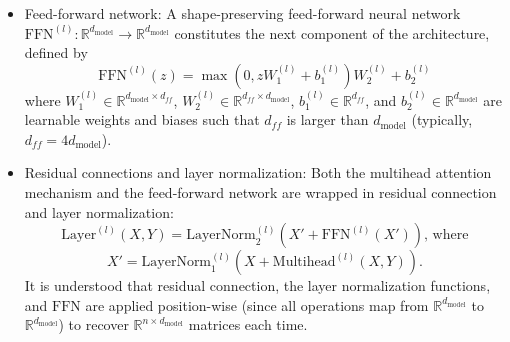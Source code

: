 \documentclass[stu,floatsintext]{apa7}
\begin{document}
\begin{itemize}
where $X\in\mathbb R^{n\times d_{\text{model}}}$ and $Y\in\mathbb R^{m\times d_{\text{model}}}$ are two input sequences of $d_{\text{model}}$-dimensional vectors, and matrices $W_i^{Q(l)}\in\mathbb R^{d_{\text{model}}\times d_k}$, $W_i^{K(l)}\in\mathbb R^{d_{\text{model}}\times d_k}$, and $W_i^{V(l)}\in\mathbb R^{d_{\text{model}}\times d_v}$ are learnable linear transformations that bring the input sequence vectors into each head's unique subspace of vector representations. Typically, $d_k=d_v=d_{\text{model}}/h$ is chosen in order to match the computational cost of a single head of attention with $d_{\text{model}}$-dimensional input vectors, but this is not restrictive. In order to summarize the outputs from all attention heads, all outputs are concatenated and projected back into the model's $d_{\text{model}}$-dimensional subspace using another learnable weight matrix $W^{O(l)}\in\mathbb R^{hd_v\times d_{\text{model}}}$. All in all, the function $\text{Multihead}^{(l)}:\mathbb R^{n\times d_{\text{model}}}\times\mathbb R^{m\times d_{\text{model}}}\to\mathbb R^{n\times d_{\text{model}}}$ wraps the entire multi-head attention process as follows:
\begin{equation}\text{Multihead}^{(l)}(X,Y) = \text{Concat}_{\text{2nd dim}}\left(\text{head}_1^{(l)}(X,Y), \dots, \text{head}_h^{(l)}(X,Y)\right)W^{O(l)}.\end{equation}
Notice that $\text{Multihead}^{(l)}$ preserves the shape of $X$.
\item Feed-forward network: A shape-preserving feed-forward neural network $\text{FFN}^{(l)}:\mathbb R^{d_{\text{model}}}\to\mathbb R^{d_{\text{model}}}$ constitutes the next component of the architecture, defined by
\begin{equation}\text{FFN}^{(l)}(z) = \max\left(0, zW_1^{(l)} + b_1^{(l)}\right)W_2^{(l)} + b_2^{(l)}\end{equation}
where $W_1^{(l)} \in \mathbb{R}^{d_{\text{model}} \times d_{ff}}$, $W_2^{(l)} \in \mathbb{R}^{d_{ff} \times d_{\text{model}}}$, $b_1^{(l)}\in\mathbb R^{d_{ff}}$, and $b_2^{(l)}\in\mathbb R^{d_{\text{model}}}$ are learnable weights and biases such that $d_{ff}$ is larger than $d_{\text{model}}$ (typically, $d_{ff}=4d_{\text{model}}$).
\item Residual connections and layer normalization: Both the multihead attention mechanism and the feed-forward network are wrapped in residual connection and layer normalization:
\begin{equation}\text{Layer}^{(l)}(X,Y) = \text{LayerNorm}_2^{(l)}\left(X' + \text{FFN}^{(l)}(X')\right)\text{, where}\end{equation}
\begin{equation}X' = \text{LayerNorm}_1^{(l)}\left(X + \text{Multihead}^{(l)}(X,Y)\right).\end{equation} 
It is understood that residual connection, the layer normalization functions, and $\text{FFN}$ are applied position-wise (since all operations map from $\mathbb R^{d_{\text{model}}}$ to $\mathbb R^{d_{\text{model}}}$) to recover $\mathbb R^{n\times d_{\text{model}}}$ matrices each time.
\end{itemize}
\end{document}
